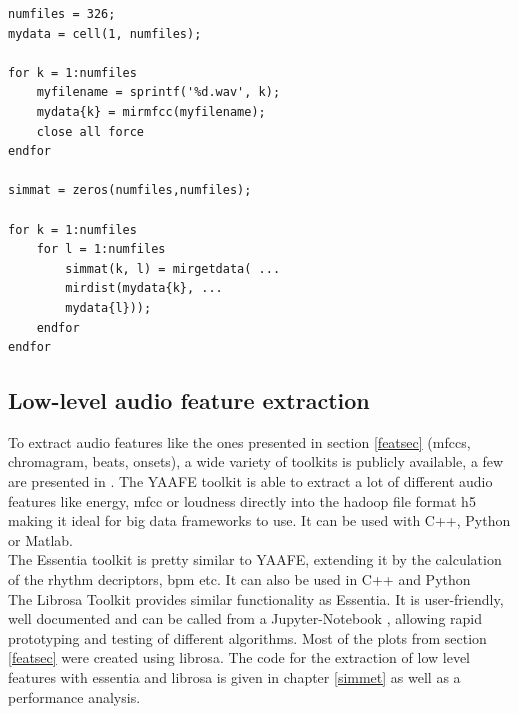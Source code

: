 \lstset{language=Matlab}          %
\FloatBarrier
\begin{lstlisting}[frame=single]  % Start your code-block
numfiles = 326;
mydata = cell(1, numfiles);

for k = 1:numfiles
	myfilename = sprintf('%d.wav', k);
	mydata{k} = mirmfcc(myfilename);
	close all force
endfor

simmat = zeros(numfiles,numfiles);

for k = 1:numfiles
	for l = 1:numfiles
		simmat(k, l) = mirgetdata( ...
		mirdist(mydata{k}, ...
		mydata{l}));
	endfor
endfor
\end{lstlisting}
\FloatBarrier

\subsection{Low-level audio feature extraction}
To extract audio features like the ones presented in section \ref{featsec} (mfccs, chromagram, beats, onsets), a wide variety of toolkits is publicly available, a few are presented in \cite{audiofeattoolb}.
The YAAFE toolkit \cite{yaafe1} is able to extract a lot of different audio features like energy, mfcc or loudness directly into the hadoop file format h5 making it ideal for big data frameworks to use. It can be used with C++, Python or Matlab.\\
The Essentia toolkit \cite{essentia1} is pretty similar to YAAFE, extending it by the calculation of the rhythm decriptors, bpm etc. It can also be used in C++ and Python\\
The Librosa Toolkit provides similar functionality \cite{labrosa1} as Essentia. It is user-friendly, well documented and can be called from a Jupyter-Notebook \cite{jupyter}, allowing rapid prototyping and testing of different algorithms. Most of the plots from section \ref{featsec} were created using librosa. The code for the extraction of low level features with essentia and librosa is given in chapter \ref{simmet} as well as a performance analysis.\\

